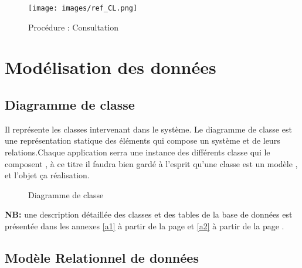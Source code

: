 \documentclass{report}
\begin{document}
    \begin{figure}[h]
        \centering
            \texttt{[image: images/ref\_CL.png]}
        \caption{Procédure : Consultation}
        \label{i}
    \end{figure}

\newpage
\section{Modélisation des données}
\subsection{Diagramme de classe}
Il représente les classes intervenant dans le système. Le diagramme de classe est une représentation statique des éléments qui compose un système et de leurs relations.Chaque application serra une instance des différents classe qui le composent , à ce titre il faudra bien gardé à l'esprit qu'une classe est un modèle , et l'objet ça réalisation.
\\
    \begin{figure}[h]
        \centering
        \caption{Diagramme de classe}
    \end{figure}

\textbf{NB:} une description détaillée des classes et des tables de la base de données est présentée dans les annexes \ref{a1} à partir de la page \pageref{a1} et \ref{a2} à partir de la page \pageref{a2}.
\newpage
\subsection{Modèle Relationnel de données}
\end{document}
